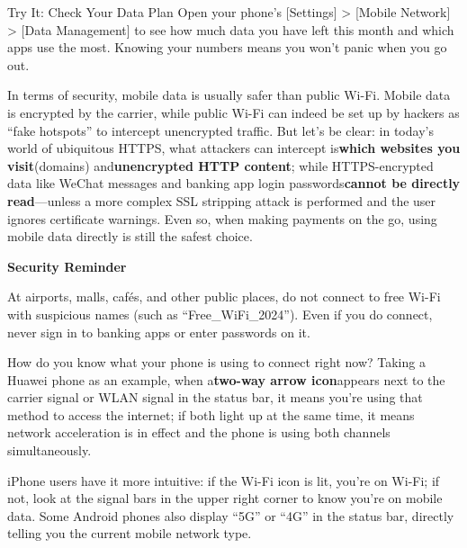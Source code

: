 \begin{tcbpractice}{Try It: Check Your Data Plan}
Open your phone's [Settings] > [Mobile Network] > [Data Management] to see how much data you have left this month and which apps use the most. Knowing your numbers means you won't panic when you go out.

\end{tcbpractice}


In terms of security, mobile data is usually safer than public Wi-Fi. Mobile data is encrypted by the carrier, while public Wi-Fi can indeed be set up by hackers as “fake hotspots” to intercept unencrypted traffic. But let's be clear: in today's world of ubiquitous HTTPS, what attackers can intercept is\textbf{which websites you visit}(domains) and\textbf{unencrypted HTTP content}; while HTTPS-encrypted data like WeChat messages and banking app login passwords\textbf{cannot be directly read}—unless a more complex SSL stripping attack is performed and the user ignores certificate warnings. Even so, when making payments on the go, using mobile data directly is still the safest choice.

\textbf{Security Reminder}\par

At airports, malls, cafés, and other public places, do not connect to free Wi-Fi with suspicious names (such as “Free\_WiFi\_2024”). Even if you do connect, never sign in to banking apps or enter passwords on it.


How do you know what your phone is using to connect right now? Taking a Huawei phone as an example, when a\textbf{two-way arrow icon}appears next to the carrier signal or WLAN signal in the status bar, it means you're using that method to access the internet; if both light up at the same time, it means network acceleration is in effect and the phone is using both channels simultaneously.

iPhone users have it more intuitive: if the Wi-Fi icon is lit, you're on Wi-Fi; if not, look at the signal bars in the upper right corner to know you're on mobile data. Some Android phones also display “5G” or “4G” in the status bar, directly telling you the current mobile network type.


